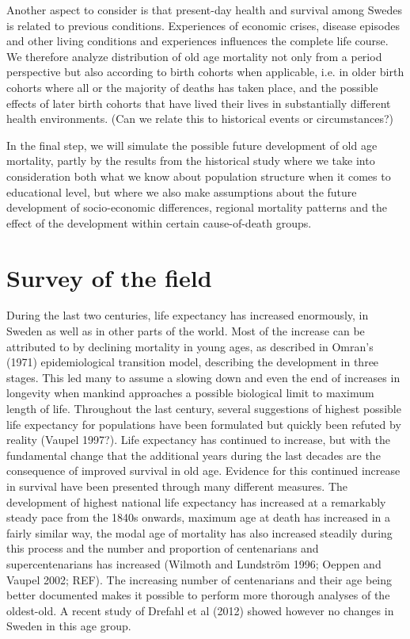 \documentclass[a4paper,12pt]{article}
\begin{document}
Another aspect to consider is that present-day health and survival among
Swedes is related to previous conditions. Experiences of economic crises,
disease episodes and other living conditions and experiences influences the
complete life course. We therefore analyze distribution of old age
mortality not only from a period perspective but also according to birth
cohorts when applicable, i.e. in older birth cohorts where all or the
majority of deaths has taken place, and the possible effects of later birth
cohorts that have lived their lives in substantially different health
environments. (Can we relate this to historical events or circumstances?) 

In the final step, we will simulate the possible future development of old
age mortality, partly by the results from the historical study where we
take into consideration both what we know about population structure when
it comes to educational level, but where we also make assumptions about the
future development of socio-economic differences, regional mortality
patterns and the effect of the development within certain cause-of-death
groups. 

\section{Survey of the field}

During the last two centuries, life expectancy has increased enormously, in
Sweden as well as in other parts of the world. Most of the increase can be
attributed to by declining mortality in young ages, as described in Omran’s
(1971) epidemiological transition model, describing the development in
three stages. This led many to assume a slowing down and even the end of
increases in longevity when mankind approaches a possible biological limit
to maximum length of life. Throughout the last century, several suggestions
of highest possible life expectancy for populations have been formulated
but quickly been refuted by reality (Vaupel 1997?). Life expectancy has
continued to increase, but with the fundamental change that the additional
years during the last decades are the consequence of improved survival in
old age. Evidence for this continued increase in survival have been
presented through many different measures. The development of highest
national life expectancy has increased at a remarkably steady pace from the
1840s onwards, maximum age at death has increased in a fairly similar way,
the modal age of mortality has also increased steadily during this process
and the number and proportion of centenarians and supercentenarians has
increased (Wilmoth and Lundström 1996; Oeppen and Vaupel 2002; REF). The
increasing number of centenarians and their age being better documented
makes it possible to perform more thorough analyses of the oldest-old. A
recent study of Drefahl et al (2012) showed however no changes in Sweden in
this age group.
 
\end{document}
